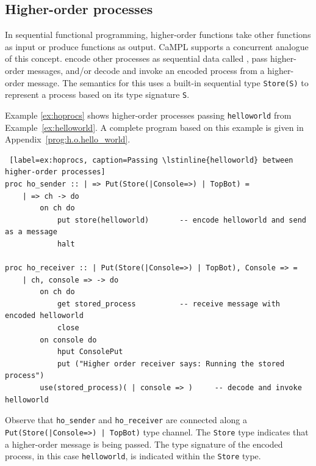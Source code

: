 \documentclass[11pt]{article}
\begin{document}
\subsection{Higher-order processes}
\label{sec:homsgs}

In sequential functional programming, higher-order functions take other functions as input or produce functions as output. 
CaMPL supports a concurrent analogue of this concept. 
encode other processes as sequential data called , pass higher-order messages, and/or decode and invoke an encoded process from a higher-order message.
The semantics for this uses a built-in sequential type \lstinline$Store(S)$ to represent a process based on its type signature \lstinline$S$.

Example \ref{ex:hoprocs} shows higher-order processes passing \lstinline$helloworld$ from Example~\ref{ex:helloworld}. 
A complete program based on this example is given in Appendix~\ref{prog:h.o.hello_world}.
\begin{lstlisting} [label=ex:hoprocs, caption=Passing \lstinline{helloworld} between higher-order processes]
proc ho_sender :: | => Put(Store(|Console=>) | TopBot) =
	| => ch -> do
		on ch do
			put store(helloworld)		-- encode helloworld and send as a message
			halt
			
proc ho_receiver :: | Put(Store(|Console=>) | TopBot), Console => =
	| ch, console => -> do
		on ch do
			get stored_process			-- receive message with encoded helloworld
			close
		on console do
			hput ConsolePut
			put ("Higher order receiver says: Running the stored process")
		use(stored_process)( | console => )		-- decode and invoke helloworld
\end{lstlisting}
Observe that \lstinline$ho_sender$ and \lstinline$ho_receiver$ are connected along a \lstinline$Put(Store(|Console=>) | TopBot)$ type channel.
The \lstinline$Store$ type indicates that a higher-order message is being passed.
The type signature of the encoded process, in this case \lstinline$helloworld$, is indicated within the \lstinline$Store$ type.
\end{document}
